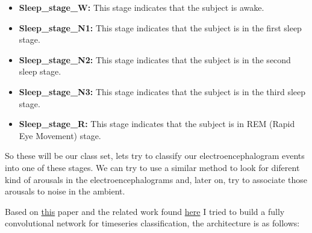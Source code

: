 \begin{itemize}
  \item \textbf{Sleep\_stage\_W:} This stage indicates that the subject is awake.
  \item \textbf{Sleep\_stage\_N1:} This stage indicates that the subject is in the first sleep stage.
  \item \textbf{Sleep\_stage\_N2:} This stage indicates that the subject is in the second sleep stage.
  \item \textbf{Sleep\_stage\_N3:} This stage indicates that the subject is in the third sleep stage.
  \item \textbf{Sleep\_stage\_R:} This stage indicates that the subject is in REM (Rapid Eye Movement) stage.
\end{itemize} 

So these will be our class set, lets try to classify our electroencephalogram events into one of these stages. We can try to use a similar method to look for diferent kind of arousals in the electroencephalograms and, later on, try to associate those arousals to noise in the ambient.

Based on \href{https://arxiv.org/abs/1611.06455}{this} paper and the related work found \href{https://keras.io/examples/timeseries/eeg_signal_classification/}{here} I tried to build a fully convolutional network for timeseries classification, the architecture is as follows:

